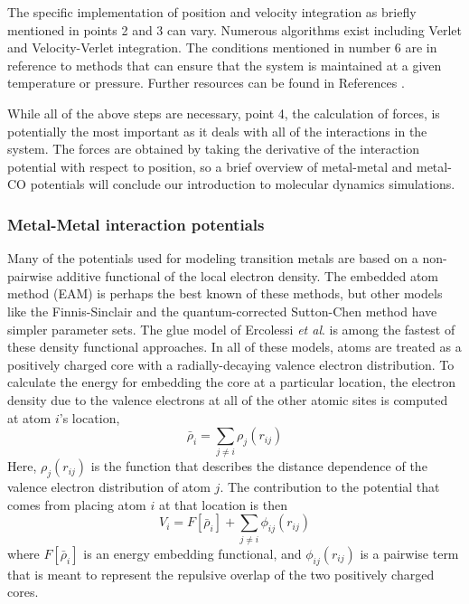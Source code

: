 The specific implementation of position and velocity integration as briefly
mentioned in points 2 and 3 can vary. Numerous algorithms exist including
Verlet\citep{Verlet:1967aa} and Velocity-Verlet
integration.\citep{Dullweber:1997aa} The conditions mentioned in number 6 are
in reference to methods that can ensure that the system is maintained at a
given temperature or pressure.  Further resources can be found in References
\citep{Hoover:1985aa, Melchionna:1993aa, Leach:2001aa}.

While all of the above steps are necessary, point 4, the calculation
of forces, is potentially the most important as it deals with all of the
interactions in the system. The forces are obtained by taking the derivative
of the interaction potential with respect to position, so a brief overview of
metal-metal and metal-CO potentials will conclude our introduction to molecular
dynamics simulations.

\subsubsection{Metal-Metal interaction potentials}
Many of the potentials used for modeling transition metals are based
on a non-pairwise additive functional of the local electron
density. The embedded atom method (EAM) is perhaps the best known of
these
methods,\citep{Foiles:1986ky, Daw:1984aq, Johnson:1989yr, Daw:1989ci, Plimpton:1993qi, Voter:1995ax, Lu:1997fv, Alemany:1998fp}
but other models like the Finnis-Sinclair\citep{Finnis:1984hl, Sutton:1990rr} and
the quantum-corrected Sutton-Chen method\citep{Goddard:1998qsc, Qi:1999dn} have simpler
parameter sets. The glue model of Ercolessi {\it et
  al}.\citep{Ercolessi:1988uo} is among the fastest of these density
functional approaches. In all of these models, atoms are treated as a
positively charged core with a radially-decaying valence electron
distribution. To calculate the energy for embedding the core at a
particular location, the electron density due to the valence electrons
at all of the other atomic sites is computed at atom $i$'s location,
\begin{equation}
\bar{\rho}_i = \sum_{j\neq i} \rho_j(r_{ij})
\end{equation}
Here, $\rho_j(r_{ij})$ is the function that describes the distance
dependence of the valence electron distribution of atom $j$. The
contribution to the potential that comes from placing atom $i$ at that
location is then
\begin{equation}
V_i =  F[ \bar{\rho}_i ]  + \sum_{j \neq i} \phi_{ij}(r_{ij})
\end{equation}
where $F[ \bar{\rho}_i ]$ is an energy embedding functional, and
$\phi_{ij}(r_{ij})$ is a pairwise term that is meant to represent the
repulsive overlap of the two positively charged cores.  

